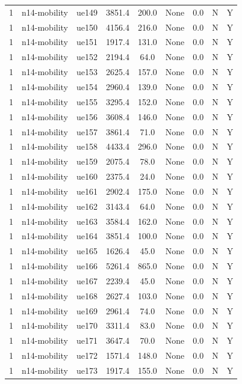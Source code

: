\begin{table}[ht]
\begin{tabular}{|c|c|c|c|c|c|c|c|c|}
1 & n14-mobility & ue149 & 3851.4 & 200.0 & None & 0.0 & N & Y \\
1 & n14-mobility & ue150 & 4156.4 & 216.0 & None & 0.0 & N & Y \\
1 & n14-mobility & ue151 & 1917.4 & 131.0 & None & 0.0 & N & Y \\
1 & n14-mobility & ue152 & 2194.4 & 64.0 & None & 0.0 & N & Y \\
1 & n14-mobility & ue153 & 2625.4 & 157.0 & None & 0.0 & N & Y \\
1 & n14-mobility & ue154 & 2960.4 & 139.0 & None & 0.0 & N & Y \\
1 & n14-mobility & ue155 & 3295.4 & 152.0 & None & 0.0 & N & Y \\
1 & n14-mobility & ue156 & 3608.4 & 146.0 & None & 0.0 & N & Y \\
1 & n14-mobility & ue157 & 3861.4 & 71.0 & None & 0.0 & N & Y \\
1 & n14-mobility & ue158 & 4433.4 & 296.0 & None & 0.0 & N & Y \\
1 & n14-mobility & ue159 & 2075.4 & 78.0 & None & 0.0 & N & Y \\
1 & n14-mobility & ue160 & 2375.4 & 24.0 & None & 0.0 & N & Y \\
1 & n14-mobility & ue161 & 2902.4 & 175.0 & None & 0.0 & N & Y \\
1 & n14-mobility & ue162 & 3143.4 & 64.0 & None & 0.0 & N & Y \\
1 & n14-mobility & ue163 & 3584.4 & 162.0 & None & 0.0 & N & Y \\
1 & n14-mobility & ue164 & 3851.4 & 100.0 & None & 0.0 & N & Y \\
1 & n14-mobility & ue165 & 1626.4 & 45.0 & None & 0.0 & N & Y \\
1 & n14-mobility & ue166 & 5261.4 & 865.0 & None & 0.0 & N & Y \\
1 & n14-mobility & ue167 & 2239.4 & 45.0 & None & 0.0 & N & Y \\
1 & n14-mobility & ue168 & 2627.4 & 103.0 & None & 0.0 & N & Y \\
1 & n14-mobility & ue169 & 2961.4 & 74.0 & None & 0.0 & N & Y \\
1 & n14-mobility & ue170 & 3311.4 & 83.0 & None & 0.0 & N & Y \\
1 & n14-mobility & ue171 & 3647.4 & 70.0 & None & 0.0 & N & Y \\
1 & n14-mobility & ue172 & 1571.4 & 148.0 & None & 0.0 & N & Y \\
1 & n14-mobility & ue173 & 1917.4 & 155.0 & None & 0.0 & N & Y \\

\end{tabular}
\end{table}
